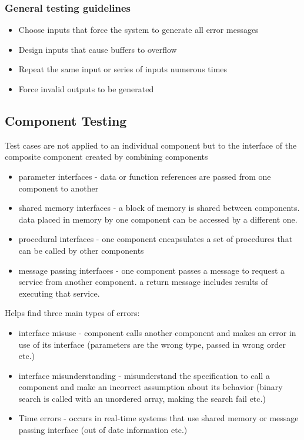 \documentclass{article}
\begin{document}
    \subsubsection*{General testing guidelines}

    \begin{itemize}
        \item Choose inputs that force the system to generate all error messages
        \item Design inputs that cause buffers to overflow
        \item Repeat the same input or series of inputs numerous times 
        \item Force invalid outputs to be generated
    \end{itemize}

    \subsection*{Component Testing}

    Test cases are not applied to an individual component but to the interface of the 
    composite component created by combining components 

    \begin{itemize}
        \item parameter interfaces - data or function references are passed from one 
        component to another 
        \item shared memory interfaces - a block of memory is shared between components.
        data placed in memory by one component can be accessed by a different one. 
        \item procedural interfaces - one component encapsulates a set of procedures 
        that can be called by other components 
        \item message passing interfaces - one component passes a message to request a 
        service from another component. a return message includes results of 
        executing that service.
    \end{itemize}

    Helps find three main types of errors:
    \begin{itemize}
        \item interface misuse - component calls another component and makes an error in 
        use of its interface (parameters are the wrong type, passed in wrong order etc.)
        \item interface misunderstanding - misunderstand the specification to call a 
        component and make an incorrect assumption about its behavior (binary search 
        is called with an unordered array, making the search fail etc.)
        \item Time errors - occurs in real-time systems that use shared memory or 
        message passing interface (out of date information etc.)
    \end{itemize}
\end{document}
